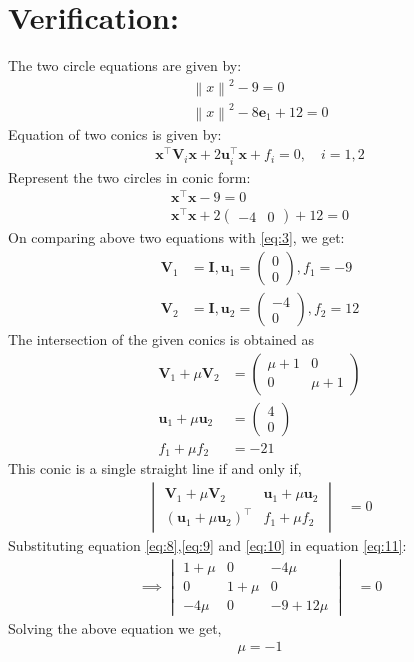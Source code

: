 \documentclass[12pt]{article}
\providecommand{\norm}[1]{\left\lVert#1\right\rVert}
\newcommand{\myvec}[1]{\ensuremath{\begin{pmatrix}#1\end{pmatrix}}}
\let\vec\mathbf
\let\vec\mathbf
\newcommand{\mydet}[1]{\ensuremath{\begin{vmatrix}#1\end{vmatrix}}}
\providecommand{\norm}[1]{\left\lVert#1\right\rVert}
\let\vec\mathbf
\begin{document}
\section*{Verification:}
 The two circle equations are given by:
\begin{align}
\label{eq:1}
	\norm{x}^2-9=0\\
	\norm{x}^2-8\vec{e}_1+12=0
\end{align}
Equation of two conics is given by:
 \begin{align}
 \vec{x}^\top\vec{V}_i\vec{x}+2\vec{u}_i^\top\vec{x}+f_i=0, \quad i=1,2
 \label{eq:3}
 \end{align}
 Represent the two circles in conic form:
 \begin{align}
	\vec{x}^\top\vec{x}-9=0\\
	\vec{x}^\top\vec{x}+2\myvec{-4&0}+12=0
\end{align}
On comparing above two equations with \eqref{eq:3}, we get:
 \begin{align}
	  \vec{V}_1&=\vec{I},\vec{u}_1=\myvec{0\\0},f_1=-9\\
	  \vec{V}_2&=\vec{I},\vec{u}_2=\myvec{-4\\0},f_2=12
\end{align}
The intersection of the given conics is obtained
as
\begin{align}
	\label{eq:8}
\vec{V}_1+\mu\vec{V}_2&= \myvec{
\mu+1 & 0\\
0 & \mu+1
}
\\ \label{eq:9}
\vec{u}_1+\mu\vec{u}_2&= \myvec{
4\\
0
}
\\ \label{eq:10}
f_1+\mu f_2&= -21
\end{align}
This conic is a single straight line if and only if, 
\begin{align}
\mydet{\vec{V}_1 + \mu\vec{V}_2 & \vec{u}_1+\mu \vec{u}_2\\ (\vec{u}_1+\mu \vec{u}_2)^{\top} & f_1 + \mu f_2} &= 0
\label{eq:11}
\end{align}
Substituting equation \eqref{eq:8},\eqref{eq:9} and \eqref{eq:10} in equation \eqref{eq:11}:
\begin{align}
\implies \mydet{1+\mu& 0 & -4\mu\\ 
0 & 1+\mu & 0 \\
-4\mu & 0 & -9+12\mu
} &= 0
\end{align}
Solving the above equation we get,
\begin{align}
    \mu = -1
\end{align}
\end{document}
